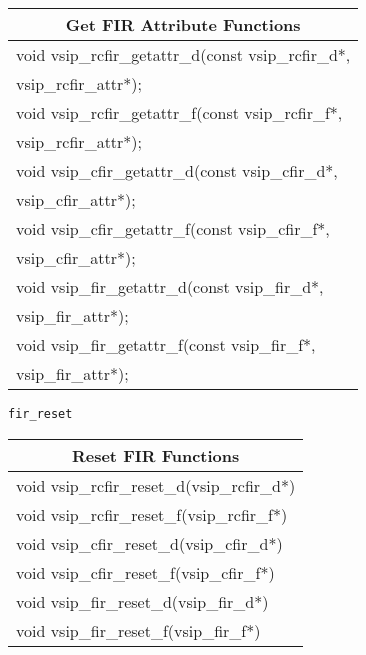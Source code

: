 \newline \hspace*{1.cm} {
\ttfamily
\begin{tabular}[H]{|l|}
\hline \multicolumn{1}{c}{\rmfamily \bfseries Get FIR Attribute Functions\vspace{.1cm}}\\ \hline
void vsip\_rcfir\_getattr\_d(const vsip\_rcfir\_d*,\\*\hspace{.7cm}vsip\_rcfir\_attr*);\\
void vsip\_rcfir\_getattr\_f(const vsip\_rcfir\_f*,\\*\hspace{.7cm}vsip\_rcfir\_attr*);\\
void vsip\_cfir\_getattr\_d(const vsip\_cfir\_d*,\\*\hspace{.7cm}vsip\_cfir\_attr*);\\
void vsip\_cfir\_getattr\_f(const vsip\_cfir\_f*,\\*\hspace{.7cm}vsip\_cfir\_attr*);\\
void vsip\_fir\_getattr\_d(const vsip\_fir\_d*,\\*\hspace{.7cm}vsip\_fir\_attr*);\\
void vsip\_fir\_getattr\_f(const vsip\_fir\_f*,\\*\hspace{.7cm}vsip\_fir\_attr*);\\\hline
\end{tabular}\vspace{.1cm}
}\vspace{.1cm}
\newline\hspace*{.8cm} \texttt{fir\_reset}
\newline \hspace*{1.cm} {
\ttfamily
\begin{tabular}[H]{|l|}
\hline \multicolumn{1}{c}{\rmfamily \bfseries Reset FIR Functions\vspace{.1cm}}\\ \hline
void vsip\_rcfir\_reset\_d(vsip\_rcfir\_d*)\\
void vsip\_rcfir\_reset\_f(vsip\_rcfir\_f*)\\
void vsip\_cfir\_reset\_d(vsip\_cfir\_d*)\\
void vsip\_cfir\_reset\_f(vsip\_cfir\_f*)\\
void vsip\_fir\_reset\_d(vsip\_fir\_d*)\\
void vsip\_fir\_reset\_f(vsip\_fir\_f*)\\\hline
\end{tabular}\\
}
